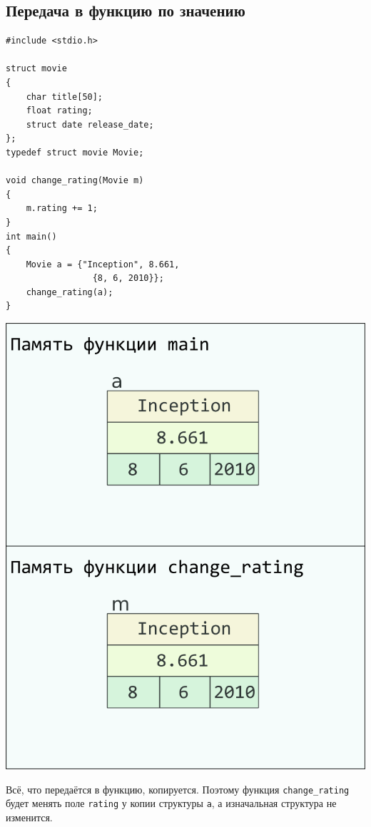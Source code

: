 \documentclass{article}
\begin{document}
\subsection*{Передача в функцию по значению}
\begin{multicols}{2}
\begin{lstlisting}
#include <stdio.h>

struct movie
{
	char title[50];
	float rating;
	struct date release_date;
};
typedef struct movie Movie;

void change_rating(Movie m)
{
	m.rating += 1;
}
int main()
{
	Movie a = {"Inception", 8.661, 
	             {8, 6, 2010}};
	change_rating(a);
}
\end{lstlisting}
\columnbreak
\begin{center}
\includegraphics[scale=1]{../../images/pointer_schemes/function_by_value.png}
\end{center}
\end{multicols}
Всё, что передаётся в функцию, копируется. Поэтому функция \texttt{change\_rating} будет менять
поле \texttt{rating} у копии структуры \texttt{a}, а изначальная структура не изменится.
\end{document}
